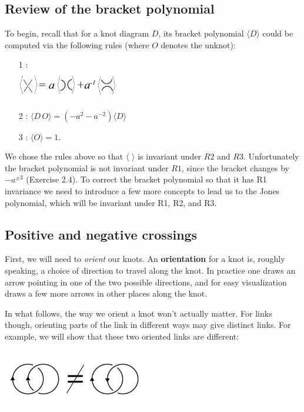 \documentclass[12 pt]{article}
\begin{document}
\subsection{Review of the bracket polynomial}
To begin, recall that for a knot diagram $D$, its bracket polynomial $\langle D\rangle$ could be computed via the following rules (where $O$ denotes the unknot):
\begin{enumerate}
\item[1]:\\
\includegraphics[height = 0.5in]{bracket_1_true.jpg}
\item[2]: $\langle D\,O\rangle=(-a^2-a^{-2})\langle D\rangle$
\item[3]: $\langle O\rangle=1.$
\end{enumerate}

We chose the rules above so that $\langle\,\,\rangle$ is invariant under $R2$ and $R3$. Unfortunately the bracket polynomial is not invariant under $R1$, since the bracket changes by $-a^{\pm3}$ (Exercise 2.4). To correct the bracket polynomial so that it has R1 invariance we need to introduce a few more concepts to lead us to the Jones polynomial, which will be invariant under R1, R2, and R3. 

\subsection{Positive and negative crossings}
First, we will need to \textit{orient} our knots. An \textbf{orientation} for a knot is, roughly speaking, a choice of direction to travel along the knot. In practice one draws an arrow pointing in one of the two possible directions, and for easy visualization draws a few more arrows in other places along the knot. 

In what follows, the way we orient a knot won't actually matter. For links though, orienting parts of the link in different ways may give distinct links. For example, we will show that these two oriented links are different:\\
\begin{center}
\includegraphics[height=1in]{hopf_not_equal.jpg}
\end{center}
\end{document}
